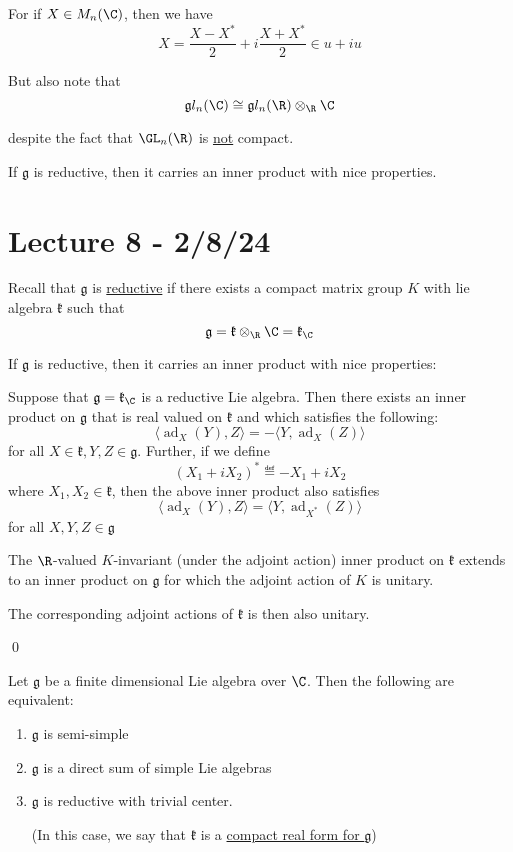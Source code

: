 \documentclass[x11names,reqno,14pt]{extarticle}
\newcommand{\mk}[1]{\mathfrak{#1}}
\newcommand{\g}{\mk{g}}
\DeclareMathOperator{\ad}{ad}
\begin{document}
For if $X \in M_n(\C)$, then we have
\[
X = \frac{X - X^*}{2} + i\frac{X + X^*}{2} \in u + iu
\]

But also note that
\[
\g l_n(\C) \cong \g l_n(\R)\otimes_\R\C
\]

despite the fact that $\GL_n(\R)$ is \underline{not} compact.

If $\g$ is reductive, then it carries an inner product with nice properties. 

\section*{Lecture 8 - 2/8/24}

Recall that $\g$ is \underline{reductive} if there exists a compact matrix group $K$ with lie algebra $\mk{k}$ such that 
\[
\g = \mk{k} \otimes_\R\C = \mk{k}_\C
\]

If $\g$ is reductive, then it carries an inner product with nice properties:

\prop

Suppose that $\g = \mk{k}_\C$ is a reductive Lie algebra. Then there exists an inner product on $\g$ that is real valued on $\mk{k}$ and which satisfies the following:
\[
\langle \ad_X(Y), Z \rangle = -\langle Y, \ad_X(Z)\rangle
\]
for all $X \in \mk{k}, Y, Z \in \g$. Further, if we define
\[
(X_1 + iX_2)^* \eqdef -X_1 + iX_2
\]
where $X_1, X_2 \in \mk{k}$, then the above inner product also satisfies 
\[
\langle \ad_X(Y),Z \rangle = \langle Y, \ad_{X^*}(Z)\rangle
\]
for all $X, Y, Z \in \g$
\proof

The $\R$-valued $K$-invariant (under the adjoint action) inner product on $\mk{k}$ extends to an inner product on $\g$ for which the adjoint action of $K$ is unitary.  

The corresponding adjoint actions of $\mk{k}$ is then also unitary. 

\qed

\thm

Let $\g$ be a finite dimensional Lie algebra over $\C$. Then the following are equivalent: 
\begin{enumerate}

\item $\g$ is semi-simple 

\item $\g$ is a direct sum of simple Lie algebras 

\item $\g$ is reductive with trivial center. \,

(In this case, we say that $\mk{k}$ is a \underline{compact real form for $\g$})

\end{enumerate}
\end{document}
